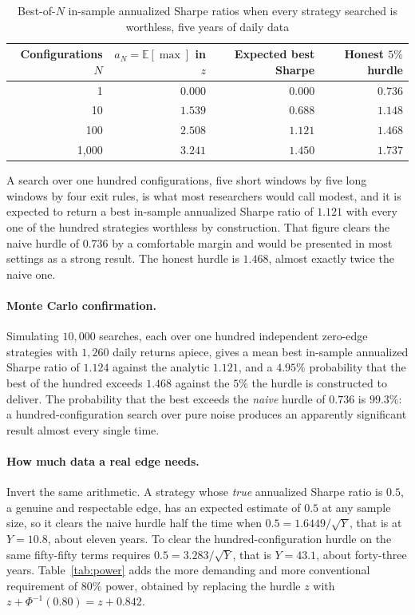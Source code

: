 \documentclass[11pt]{article}
\theoremstyle{remark}
\theoremstyle{definition}
\begin{document}
\begin{table}[htbp]
\centering
\caption{Best-of-$N$ in-sample annualized Sharpe ratios when every strategy searched is worthless, five years of daily data}
\label{tab:maxN}
\begin{tabular}{rrrr}
\toprule
Configurations $N$ & $a_N = \mathbb{E}[\max]$ in $z$ & Expected best Sharpe & Honest $5\%$ hurdle \\
\midrule
1       & $0.000$ & $0.000$ & $0.736$ \\
10      & $1.539$ & $0.688$ & $1.148$ \\
100     & $2.508$ & $1.121$ & $1.468$ \\
1{,}000 & $3.241$ & $1.450$ & $1.737$ \\
\bottomrule
\end{tabular}
\end{table}

A search over one hundred configurations, five short windows by five long windows by four exit rules, is what most researchers would call modest, and it is expected to return a best in-sample annualized Sharpe ratio of $1.121$ with every one of the hundred strategies worthless by construction. That figure clears the naive hurdle of $0.736$ by a comfortable margin and would be presented in most settings as a strong result. The honest hurdle is $1.468$, almost exactly twice the naive one.

\paragraph{Monte Carlo confirmation.} Simulating $10{,}000$ searches, each over one hundred independent zero-edge strategies with $1{,}260$ daily returns apiece, gives a mean best in-sample annualized Sharpe ratio of $1.124$ against the analytic $1.121$, and a $4.95\%$ probability that the best of the hundred exceeds $1.468$ against the $5\%$ the hurdle is constructed to deliver. The probability that the best exceeds the \emph{naive} hurdle of $0.736$ is $99.3\%$: a hundred-configuration search over pure noise produces an apparently significant result almost every single time.

\paragraph{How much data a real edge needs.} Invert the same arithmetic. A strategy whose \emph{true} annualized Sharpe ratio is $0.5$, a genuine and respectable edge, has an expected estimate of $0.5$ at any sample size, so it clears the naive hurdle half the time when $0.5 = 1.6449/\sqrt{Y}$, that is at $Y = 10.8$, about eleven years. To clear the hundred-configuration hurdle on the same fifty-fifty terms requires $0.5 = 3.283/\sqrt{Y}$, that is $Y = 43.1$, about forty-three years. Table~\ref{tab:power} adds the more demanding and more conventional requirement of $80\%$ power, obtained by replacing the hurdle $z$ with $z + \Phi^{-1}(0.80) = z + 0.842$.
\end{document}

